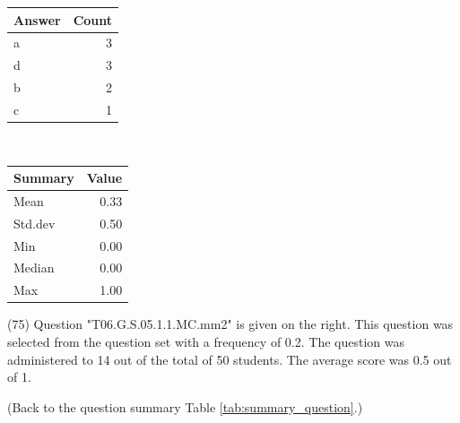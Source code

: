 \documentclass[12pt,english,nohyper]{tufte-handout}\usepackage[]{graphicx}\usepackage[]{color}
\begin{document}
\begin{center}%
\begin{tabular}{lr}
  \hline
Answer & Count \\ 
  \hline
a &   3 \\ 
  d &   3 \\ 
  b &   2 \\ 
  c &   1 \\ 
   \hline
\end{tabular}
~~~~~~~~%
\begin{tabular}{lr}
  \hline
Summary & Value \\ 
  \hline
Mean & 0.33 \\ 
  Std.dev & 0.50 \\ 
  Min & 0.00 \\ 
  Median & 0.00 \\ 
  Max & 1.00 \\ 
   \hline
\end{tabular}
\end{center}\newpage{} (75) Question "T06.G.S.05.1.1.MC.mm2" is given on the right. This question was selected from the question set with a frequency of 0.2. The question was administered to 14 out of the total of 50 students. The average score was 0.5 out of 1.

 (Back to the question summary Table \ref{tab:summary_question}.)
\end{document}
